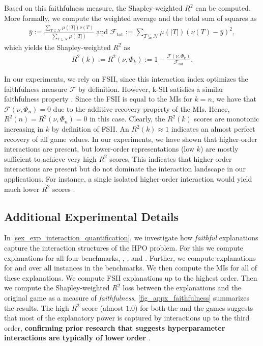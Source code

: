 \documentclass[letterpaper]{article} %
\begin{document}
Based on this faithfulness measure, the Shapley-weighted $R^2$ can be computed.
More formally, we compute the weighted average and the total sum of squares as
\begin{align*}
    \bar y := \frac{\sum_{T \subseteq \mathcal N} \mu(\vert T \vert) \nu(T)}{\sum_{T \subseteq \mathcal N} \mu(\vert T \vert)} \text{ and } \mathcal F_{\text{tot}} := \sum_{T \subseteq \mathcal N} \mu(\vert T \vert) \left(\nu(T) - \bar y\right)^2,
\end{align*}
which yields the Shapley-weighted $R^2$ as
\begin{align*}
    R^2(k) := R^2(\nu,\Phi_k) := 1 - \frac{\mathcal F(\nu,\Phi_k)}{\mathcal F_{\text{tot}}}.
\end{align*}

In our experiments, we rely on \gls*{FSII}, since this interaction index optimizes the faithfulness measure $\mathcal F$ by definition.
However, \gls*{k-SII} satisfies a similar faithfulness property \citep{DBLP:conf/icml/FumagalliMKHH24}.
Since the \gls*{FSII} is equal to the \glspl*{MI} for $k=n$, we have that $\mathcal F(\nu,\Phi_n) = 0$  due to the additive recovery property of the \glspl*{MI}.
Hence, $R^2(n)=R^2(\nu,\Phi_n)=0$ in this case.
Clearly, the $R^2(k)$ scores are monotonic increasing in $k$ by definition of \gls*{FSII}.
An $R^2(k) \approx 1$ indicates an almost perfect recovery of all game values.
In our experiments, we have shown that higher-order interactions are present, but lower-order representations (low $k$) are mostly sufficient to achieve very high $R^2$ scores.
This indicates that higher-order interactions are present but do not dominate the interaction landscape in our applications.
For instance, a single isolated higher-order interaction would yield much lower $R^2$ scores \citep{Muschalik.2024}.

\subsection{Additional Experimental Details}

In \cref{sex_exp_interaction_quantification}, we investigate how \emph{faithful} \tool explanations capture the interaction structures of the HPO problem. For this we compute \dstunability explanations for all four benchmarks, \lcbench, \rbvranger \pdone, and \jahs.
Further, we compute \tunability explanations for \lcbench and \rbvranger over all instances in the benchmarks.
We then compute the \glspl*{MI} for all of these explanations. We compute \tool \gls*{FSII} explanations up to the highest order. Then we compute the Shapley-weighted $R^2$ loss between the explanations and the original game as a measure of \emph{faithfulness}.
\cref{fig_appx_faithfulness} summarizes the results. 
The high $R^2$ score (almost $1.0$) for both the \dstunability and the \tunability games suggests that most of the explanatory power is captured by interactions up to the third order, \textbf{confirming prior research that suggests hyperparameter interactions are typically of lower order} \cite{DBLP:conf/gecco/PushakH20a}. 
\end{document}
